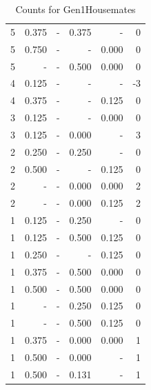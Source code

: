 \documentclass[a4paper]{article}\usepackage{graphicx, color}
\begin{document}
\begin{table}[ht]
\begin{tabular}{rrrrrr}
   \rowcolor{sosoColor} 5 & 0.375 & - & 0.375 & - & 0 \\ 
   \rowcolor{nullColor} 5 & 0.750 & - & - & 0.000 & 0 \\ 
   \rowcolor{sosoColor} 5 & - & - & 0.500 & 0.000 & 0 \\ 
   \rowcolor{nullColor} 4 & 0.125 & - & - & - & -3 \\ 
   \rowcolor{nullColor} 4 & 0.375 & - & - & 0.125 & 0 \\ 
   \rowcolor{nullColor} 3 & 0.125 & - & - & 0.000 & 0 \\ 
   \rowcolor{sosoColor} 3 & 0.125 & - & 0.000 & - & 3 \\ 
   \rowcolor{sosoColor} 2 & 0.250 & - & 0.250 & - & 0 \\ 
   \rowcolor{nullColor} 2 & 0.500 & - & - & 0.125 & 0 \\ 
   \rowcolor{sosoColor} 2 & - & - & 0.000 & 0.000 & 2 \\ 
   \rowcolor{sosoColor} 2 & - & - & 0.000 & 0.125 & 2 \\ 
   \rowcolor{sosoColor} 1 & 0.125 & - & 0.250 & - & 0 \\ 
   \rowcolor{sosoColor} 1 & 0.125 & - & 0.500 & 0.125 & 0 \\ 
   \rowcolor{nullColor} 1 & 0.250 & - & - & 0.125 & 0 \\ 
   \rowcolor{sosoColor} 1 & 0.375 & - & 0.500 & 0.000 & 0 \\ 
   \rowcolor{sosoColor} 1 & 0.500 & - & 0.500 & 0.000 & 0 \\ 
   \rowcolor{sosoColor} 1 & - & - & 0.250 & 0.125 & 0 \\ 
   \rowcolor{sosoColor} 1 & - & - & 0.500 & 0.125 & 0 \\ 
   \rowcolor{sosoColor} 1 & 0.375 & - & 0.000 & 0.000 & 1 \\ 
   \rowcolor{sosoColor} 1 & 0.500 & - & 0.000 & - & 1 \\ 
   \rowcolor{sosoColor} 1 & 0.500 & - & 0.131 & - & 1 \\ 
   \hline
\end{tabular}
\caption{Counts for Gen1Housemates} 
\end{table}
\end{document}
